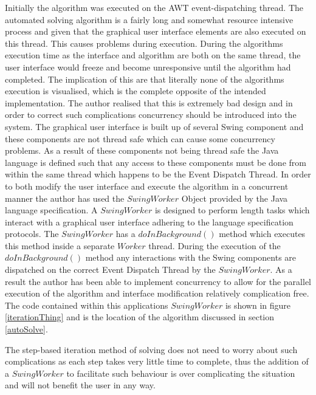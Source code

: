 Initially the algorithm was executed on the AWT event-dispatching thread. The automated solving algorithm is a fairly long and somewhat resource intensive process and given that the graphical user interface elements are also executed on this thread. This causes problems during execution. During the algorithms execution time as the interface and algorithm are both on the same thread, the user interface would freeze and become unresponsive until the algorithm had completed. The implication of this are that literally none of the algorithms execution is visualised, which is the complete opposite of the intended implementation. The author realised that this is extremely bad design and in order to correct such complications concurrency should be introduced into the system. The graphical user interface is built up of several Swing component and these components are not thread safe which can cause some concurrency problems. As a result of these components not being thread safe the Java language is defined such that any access to these components must be done from within the same thread which happens to be the Event Dispatch Thread. In order to both modify the user interface and execute the algorithm in a concurrent manner the author has used the $SwingWorker$ Object provided by the Java language specification. A $SwingWorker$ is designed to perform length tasks which interact with a graphical user interface adhering to the language specification protocols. The $SwingWorker$ has a $doInBackground()$ method which executes this method inside a separate $Worker$ thread. During the execution of the $doInBackground()$ method any interactions with the Swing components are dispatched on the correct Event Dispatch Thread by the $SwingWorker$. As a result the author has been able to implement concurrency to allow for the parallel execution of the algorithm and interface modification relatively complication free. The code contained within this applications $SwingWorker$ is shown in figure \ref{iterationThing} and is the location of the algorithm discussed in section \ref{autoSolve}. 

The step-based iteration method of solving does not need to worry about such complications as each step takes very little time to complete, thus the addition of a $SwingWorker$ to facilitate such behaviour is over complicating the situation and will not benefit the user in any way.

